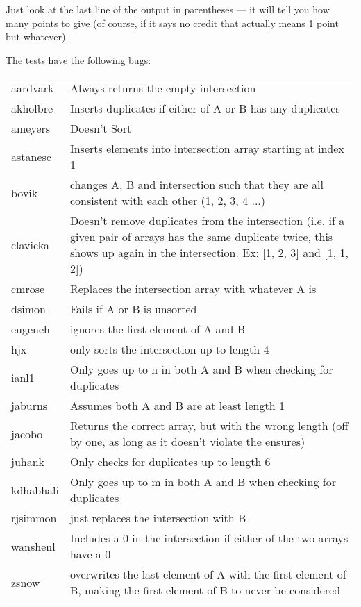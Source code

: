 \begin{solution}
  Just look at the last line of the output in parentheses --- it will
  tell you how many points to give (of course, if it says no credit
  that actually means 1 point but whatever).

  The tests have the following bugs:\\
  \begin{center}
  \begin{tabular}{| m{3cm} | m{12cm} |}
  	\hline \centering aardvark & Always returns the empty intersection\\\cline{1-2}
  	\centering akholbre & Inserts duplicates if either of A or B has any duplicates\\\cline{1-2}
  	\centering ameyers & Doesn't Sort\\\cline{1-2}
  	\centering astanesc & Inserts elements into intersection array starting at index 1\\\cline{1-2}
  	\centering bovik & changes A, B and intersection such that they are all consistent with each other (1, 2, 3, 4 ...)\\\cline{1-2}
  	\centering clavicka & Doesn't remove duplicates from the intersection (i.e. if a given pair of arrays has the same duplicate twice, this shows up again in the intersection. Ex: [1, 2, 3] and [1, 1, 2])\\\cline{1-2}
  	\centering cmrose & Replaces the intersection array with whatever A is\\\cline{1-2}
  	\centering dsimon & Fails if A or B is unsorted\\\cline{1-2}
  	\centering eugeneh & ignores the first element of A and B\\\cline{1-2}
  	\centering hjx & only sorts the intersection up to length 4\\\cline{1-2}
  	\centering ianl1 & Only goes up to n in both A and B when checking for duplicates\\\cline{1-2}
  	\centering jaburns & Assumes both A and B are at least length 1\\\cline{1-2}
  	\centering jacobo & Returns the correct array, but with the wrong length (off by one, as long as it doesn't violate the ensures)\\\cline{1-2}
  	\centering juhank & Only checks for duplicates up to length 6\\\cline{1-2}
  	\centering kdhabhali & Only goes up to m in both A and B when checking for duplicates\\\cline{1-2}
  	\centering rjsimmon & just replaces the intersection with B\\\cline{1-2}
  	\centering wanshenl & Includes a 0 in the intersection if either of the two arrays have a 0\\\cline{1-2}
  	\centering zsnow & overwrites the last element of A with the first element of B, making the first element of B to never be considered\\\cline{1-2}
  	\end{tabular}
  	\end{center}
\end{solution}
